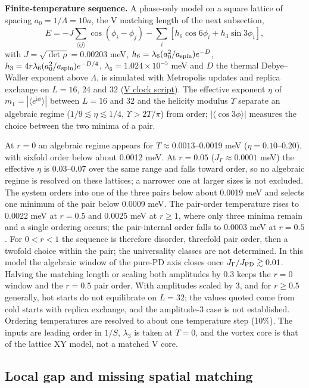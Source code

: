 \textbf{Finite-temperature sequence.} A phase-only model on a square
lattice of spacing \(a_0=1/\Lambda=10a\), the V matching length of the
next subsection,
\[
E=-J\sum_{\langle ij\rangle}\cos(\phi_i-\phi_j)
-\sum_i\left[h_6\cos6\phi_i+h_3\sin3\phi_i\right],
\]
with \(J=\sqrt{\det\rho}=0.00203\) meV,
\(h_6=\lambda_6(a_0^2/a_{\rm spin})e^{-D}\),
\(h_3=4r\lambda_6(a_0^2/a_{\rm spin})e^{-D/4}\),
\(\lambda_6=1.024\times10^{-5}\) meV and \(D\) the thermal Debye--Waller
exponent above \(\Lambda\), is simulated with Metropolis updates and
replica exchange on \(L=16\), 24 and 32
(\href{../../../examples/nbcp_v_clock_pinning_mc.py}{V clock
script}). The effective exponent \(\eta\) of
\(m_1=|\langle e^{\mathrm i\phi}\rangle|\) between \(L=16\) and 32 and the
helicity modulus \(\Upsilon\) separate an algebraic regime
(\(1/9\lesssim\eta\lesssim1/4\), \(\Upsilon>2T/\pi\)) from order;
\(|\langle\cos3\phi\rangle|\) measures the choice between the two minima
of a pair.

At \(r=0\) an algebraic regime appears for \(T\approx0.0013\)--0.0019 meV
(\(\eta=0.10\)--0.20), with sixfold order below about 0.0012 meV. At
\(r=0.05\) (\(J_\Gamma\approx0.0001\) meV) the effective \(\eta\) is
0.03--0.07 over the same range and falls toward order, so no algebraic
regime is resolved on these lattices; a narrower one at larger sizes is
not excluded. The system orders into one of the three pairs below about
0.0019 meV and selects one minimum of the pair below 0.0009 meV. The
pair-order temperature rises to 0.0022 meV at \(r=0.5\) and 0.0025 meV at
\(r\ge1\), where only three minima remain and a single ordering occurs;
the pair-internal order falls to 0.0003 meV at \(r=0.5\). For \(0<r<1\)
the sequence is therefore disorder, threefold pair order, then a twofold
choice within the pair; the universality classes are not determined. In
this model the algebraic window of the pure-PD axis closes once
\(J_\Gamma/J_{\rm PD}\gtrsim0.01\). Halving the matching length or scaling
both amplitudes by 0.3 keeps the \(r=0\) window and the \(r=0.5\) pair
order. With amplitudes scaled by 3, and for \(r\ge0.5\) generally, hot
starts do not equilibrate on \(L=32\); the values quoted come from cold
starts with replica exchange, and the amplitude-3 case is not
established. Ordering temperatures are resolved to about one temperature
step (10\%). The inputs are leading order in \(1/S\), \(\lambda_3\) is
taken at \(T=0\), and the vortex core is that of the lattice XY model,
not a matched V core.

\subsection{Local gap and missing spatial
matching}\label{local-gap-and-missing-spatial-matching}

